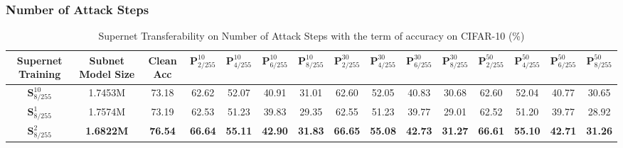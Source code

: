 \documentclass[journal]{IEEEtran}
\begin{document}
\subsubsection{\textbf{Number of Attack Steps}}

\begin{table*}[ht]
    \centering
    \setlength{\tabcolsep}{0.5mm}
    \caption{Supernet Transferability on Number of Attack Steps with the term of accuracy on CIFAR-10 (\%)}
    \begin{tabular}{c|c|c|cccccccccccc}
    Supernet Training& Subnet Model Size & Clean Acc & $\textbf{P}_{2/255}^{10}$ & $\textbf{P}_{4/255}^{10}$ & $\textbf{P}_{6/255}^{10}$ & $\textbf{P}_{8/255}^{10}$ & $\textbf{P}_{2/255}^{30}$ & $\textbf{P}_{4/255}^{30}$ & $\textbf{P}_{6/255}^{30}$ & $\textbf{P}_{8/255}^{30}$ & $\textbf{P}_{2/255}^{50}$ & $\textbf{P}_{4/255}^{50}$ & $\textbf{P}_{6/255}^{50}$ & $\textbf{P}_{8/255}^{50}$\\
    \hline
    $\textbf{S}_{8/255}^{10}$ & 1.7453M & 73.18 & 62.62 & 52.07 & 40.91 & 31.01 & 62.60 & 52.05 & 40.83 & 30.68 & 62.60 & 52.04 & 40.77 & 30.65 \\
    \hline
    $\textbf{S}_{8/255}^{1}$ & 1.7574M & 73.19 & 62.53 & 51.23 &39.83 & 29.35 & 62.55  & 51.23 & 39.77 & 29.01 & 62.52 & 51.20 & 39.77 & 28.92 \\
    \hline
    $\textbf{S}_{8/255}^{2}$ & \textbf{1.6822M} & \textbf{76.54} & \textbf{66.64} & \textbf{55.11} & \textbf{42.90}  & \textbf{31.83} & \textbf{66.65}  & \textbf{55.08}  & \textbf{42.73}  & \textbf{31.27} & \textbf{66.61} & \textbf{55.10} & \textbf{42.71} & \textbf{31.26} \\
    \hline
    \end{tabular}\label{tab:supernet_transferability_number_of_attack_steps}
\end{table*}
\end{document}
